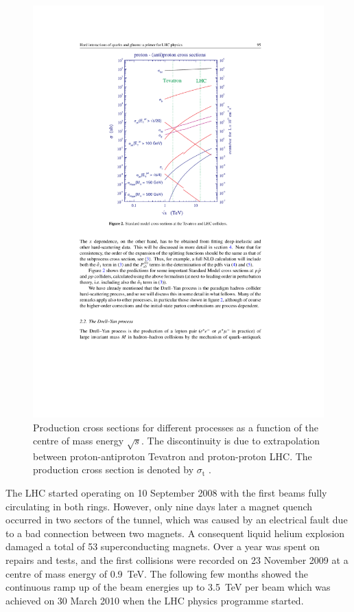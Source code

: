 \newpage
\begin{figure}[!htbp]
  \centering
  \leavevmode
  \includegraphics[width=0.7\columnwidth]{production_cross_sections}
  \caption[Production cross sections for different processes as a function of the centre of mass energy]{Production
  cross sections for different processes as a function of the centre of mass energy $\sqrt{s}$. The discontinuity is due
  to extrapolation between proton-antiproton Tevatron and proton-proton LHC. The \ttbar production cross section is
  denoted by $\sigma_\textrm{t}$ \autocite{primer_LHC}.}
  \label{fig:production_cross_sections}
\end{figure}

The LHC started operating on 10 September 2008 with the first beams fully circulating in both rings. However, only nine
days later a magnet quench occurred in two sectors of the tunnel, which was caused by an electrical fault due to a bad
connection between two magnets. A consequent liquid helium explosion damaged a total of 53 superconducting magnets. Over
a year was spent on repairs and tests, and the first collisions were recorded on 23 November 2009 at a centre of mass
energy of \SI{0.9}{\TeV}. The following few months showed the continuous ramp up of the beam energies up to
\SI{3.5}{\TeV} per beam which was achieved on 30 March 2010 when the LHC physics programme started.


